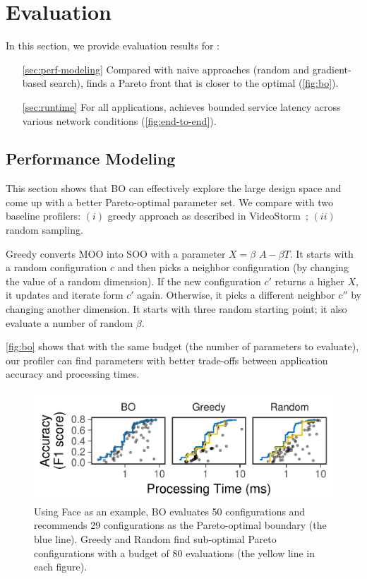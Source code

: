 \section{Evaluation}
\label{sec:evaluation}

In this section, we provide evaluation results for \sysname{}:

\begin{itemize}[itemsep=0pt, topsep=1pt]
\item[\autoref{sec:perf-modeling}] Compared with naive approaches (random and
  gradient-based search), \sysname{} finds a Pareto front that is closer to the
  optimal (\autoref{fig:bo}).
\item[\autoref{sec:runtime}] For all applications, \sysname{} achieves bounded
  service latency across various network conditions (\autoref{fig:end-to-end}).
\end{itemize}

\subsection{Performance Modeling}
\label{sec:perf-modeling}

This section shows that BO can effectively explore the large design space and
come up with a better Pareto-optimal parameter set. We compare \sysname{} with
two baseline profilers: $(i)$ greedy approach as described in
VideoStorm~\cite{zhang2017live}; $(ii)$ random sampling.

Greedy converts MOO into SOO with a parameter $X = \beta$ $A - \beta T$. It
starts with a random configuration $c$ and then picks a neighbor configuration
(by changing the value of a random dimension). If the new configuration $c'$
returns a higher $X$, it updates and iterate form $c'$ again. Otherwise, it
picks a different neighbor $c''$ by changing another dimension. It starts with
three random starting point; it also evaluate a number of random $\beta$.

\autoref{fig:bo} shows that with the same budget (the number of parameters to
evaluate), our profiler can find parameters with better trade-offs between
application accuracy and processing times.

\begin{figure}
  \centering
  \includegraphics[width=0.95\columnwidth]{figures/profiling.pdf}
  \caption{Using Face as an example, BO evaluates 50 configurations and
    recommends 29 configurations as the Pareto-optimal boundary (the blue
    line). Greedy and Random find sub-optimal Pareto configurations with a
    budget of 80 evaluations (the yellow line in each figure).}
  \label{fig:bo}
\end{figure}

